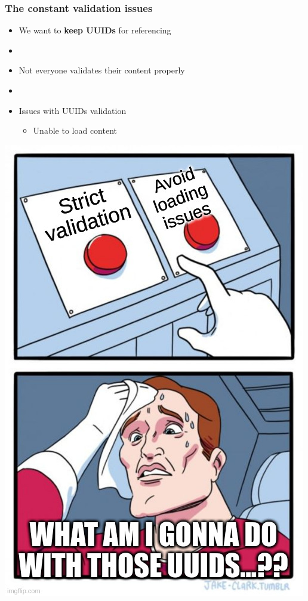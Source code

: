 \begin{frame}
    \frametitle{The constant validation issues}
    \begin{minipage}{0.7\textwidth}
        \begin{itemize}
            \item We want to \textbf{keep UUIDs} for referencing
            \item []
            \item Not everyone validates their content properly
            \pause
            \item []
            \item Issues with UUIDs validation
            \begin{itemize}
                \item Unable to load content
            \end{itemize}
        \end{itemize}
    \end{minipage}%
    \begin{minipage}{0.3\textwidth}
        \includegraphics[scale=0.25]{images/two_buttons_dilemna.jpg}
    \end{minipage}
\end{frame}

